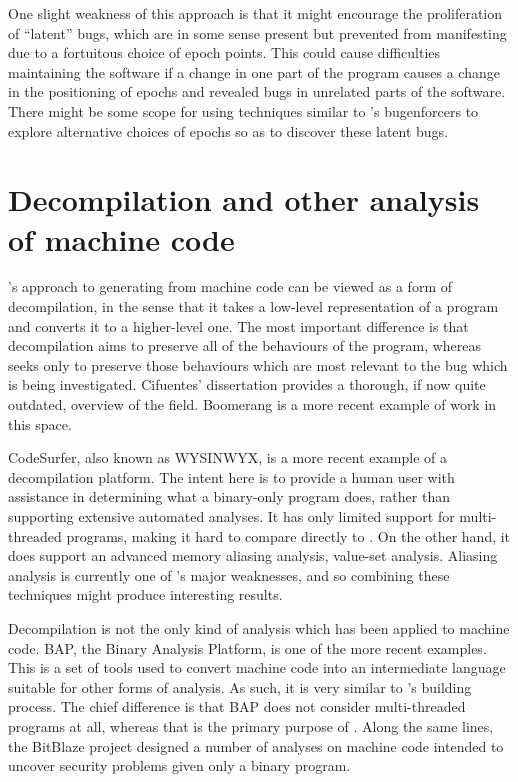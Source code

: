 One slight weakness of this approach is that it might encourage the
proliferation of ``latent'' bugs, which are in some sense present but
prevented from manifesting due to a fortuitous choice of epoch points.
This could cause difficulties maintaining the software if a change in
one part of the program causes a change in the positioning of epochs
and revealed bugs in unrelated parts of the software.  There might be
some scope for using techniques similar to {\technique}'s
\glspl{bugenforcer} to explore alternative choices of epochs so as to
discover these latent bugs.



\section{Decompilation and other analysis of machine code}

{\Technique}'s approach to generating {\StateMachines} from machine
code can be viewed as a form of decompilation, in the sense that it
takes a low-level representation of a program and converts it to a
higher-level one.  The most important difference is that decompilation
aims to preserve all of the behaviours of the program, whereas
{\technique} seeks only to preserve those behaviours which are most
relevant to the bug which is being investigated.  Cifuentes'
dissertation\cite{Cifuentes1994} provides a thorough, if now quite
outdated, overview of the field.  Boomerang\cite{Emmerik2004} is a
more recent example of work in this space.

CodeSurfer\cite{Balakrishnan2005a,Balakrishnan2008}, also known as
WYSINWYX, is a more recent example of a decompilation platform.  The
intent here is to provide a human user with assistance in determining
what a binary-only program does, rather than supporting extensive
automated analyses.  It has only limited support for multi-threaded
programs, making it hard to compare directly to {\technique}.  On the
other hand, it does support an advanced memory aliasing analysis,
value-set analysis\cite{Balakrishnan2004}.  Aliasing analysis is
currently one of {\technique}'s major weaknesses, and so combining
these techniques might produce interesting results.

Decompilation is not the only kind of analysis which has been applied
to machine code.  BAP, the Binary Analysis Platform\cite{Brumley2011},
is one of the more recent examples.  This is a set of tools used to
convert machine code into an intermediate language suitable for other
forms of analysis.  As such, it is very similar to {\technique}'s
{\StateMachine} building process.  The chief difference is that BAP
does not consider multi-threaded programs at all, whereas that is the
primary purpose of {\technique}.  Along the same lines, the
BitBlaze\cite{Song2008} project designed a number of analyses on
machine code intended to uncover security problems given only a binary
program.

